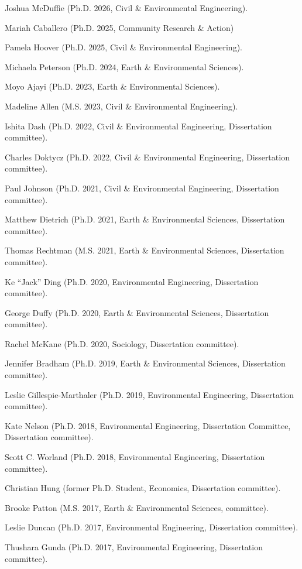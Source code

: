 \item Joshua McDuffie (Ph.D. 2026, Civil \& Environmental Engineering).
\item Mariah Caballero (Ph.D. 2025, Community Research \& Action)
\item Pamela Hoover (Ph.D. 2025, Civil \& Environmental Engineering).
\item Michaela Peterson (Ph.D. 2024, Earth \& Environmental Sciences).
\item Moyo Ajayi (Ph.D. 2023, Earth \& Environmental Sciences).
\item Madeline Allen (M.S. 2023, Civil \& Environmental Engineering).
\item Ishita Dash (Ph.D. 2022, Civil \& Environmental Engineering, Dissertation committee).
\item Charles Doktycz (Ph.D. 2022, Civil \& Environmental Engineering, Dissertation committee).
\item Paul Johnson (Ph.D. 2021, Civil \& Environmental Engineering, Dissertation committee).
\item Matthew Dietrich (Ph.D. 2021, Earth \& Environmental Sciences, Dissertation committee).
\item Thomas Rechtman (M.S. 2021, Earth \& Environmental Sciences, Dissertation committee).
\item Ke ``Jack'' Ding (Ph.D. 2020, Environmental Engineering, Dissertation committee).
\item George Duffy (Ph.D. 2020, Earth \& Environmental Sciences, Dissertation committee).
\item Rachel McKane (Ph.D. 2020, Sociology, Dissertation committee).
\item Jennifer Bradham (Ph.D. 2019, Earth \& Environmental Sciences, Dissertation committee).
\item Leslie Gillespie-Marthaler (Ph.D. 2019, Environmental Engineering, Dissertation committee).
\item Kate Nelson (Ph.D. 2018, Environmental Engineering, Dissertation Committee, Dissertation committee).
\item Scott C. Worland (Ph.D. 2018, Environmental Engineering, Dissertation committee).
\item Christian Hung (former Ph.D. Student, Economics, Dissertation committee).
\item Brooke Patton (M.S. 2017, Earth \& Environmental Sciences, committee).
\item Leslie Duncan (Ph.D. 2017, Environmental Engineering, Dissertation committee).
\item Thushara Gunda (Ph.D. 2017, Environmental Engineering, Dissertation committee).
